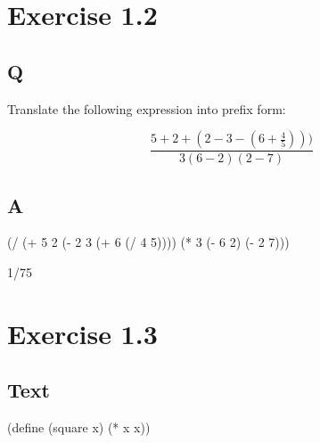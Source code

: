 \documentclass[
]{article}
\newenvironment{Shaded}{}{}
\newcommand{\DecValTok}[1]{\textcolor[rgb]{0.25,0.63,0.44}{#1}}
\newcommand{\ExtensionTok}[1]{#1}
\newcommand{\FunctionTok}[1]{\textcolor[rgb]{0.02,0.16,0.49}{#1}}
\newcommand{\NormalTok}[1]{#1}
\newcommand{\OperatorTok}[1]{\textcolor[rgb]{0.40,0.40,0.40}{#1}}
\begin{document}
\hypertarget{exercise-1.2}{%
\section{Exercise 1.2}\label{exercise-1.2}}

\hypertarget{q-1}{%
\subsection{Q}\label{q-1}}

Translate the following expression into prefix form:

\begin{equation}
  \frac{5 + 2 + (2 - 3 - (6 + \frac{4}{5})))}
            {3(6 - 2)(2 - 7)}
\end{equation}

\hypertarget{a-1}{%
\subsection{A}\label{a-1}}

\hypertarget{EX1-2}{%
\label{EX1-2}}%
\begin{Shaded}
\begin{Highlighting}[numbers=left,,]
\NormalTok{(}\OperatorTok{/}\NormalTok{ (}\OperatorTok{+} \DecValTok{5} \DecValTok{2}\NormalTok{ (}\OperatorTok{{-}} \DecValTok{2} \DecValTok{3}\NormalTok{ (}\OperatorTok{+} \DecValTok{6}\NormalTok{ (}\OperatorTok{/} \DecValTok{4} \DecValTok{5}\NormalTok{))))}
\NormalTok{   (}\OperatorTok{*} \DecValTok{3}\NormalTok{ (}\OperatorTok{{-}} \DecValTok{6} \DecValTok{2}\NormalTok{) (}\OperatorTok{{-}} \DecValTok{2} \DecValTok{7}\NormalTok{)))}
\end{Highlighting}
\end{Shaded}

1/75

\hypertarget{exercise-1.3}{%
\section{Exercise 1.3}\label{exercise-1.3}}

\hypertarget{text}{%
\subsection{Text}\label{text}}

\hypertarget{square}{%
\label{square}}%
\begin{Shaded}
\begin{Highlighting}[numbers=left,,]
\NormalTok{(}\ExtensionTok{define}\FunctionTok{ }\NormalTok{(square x)}
\NormalTok{  (}\OperatorTok{*}\NormalTok{ x x))}
\end{Highlighting}
\end{Shaded}
\end{document}
